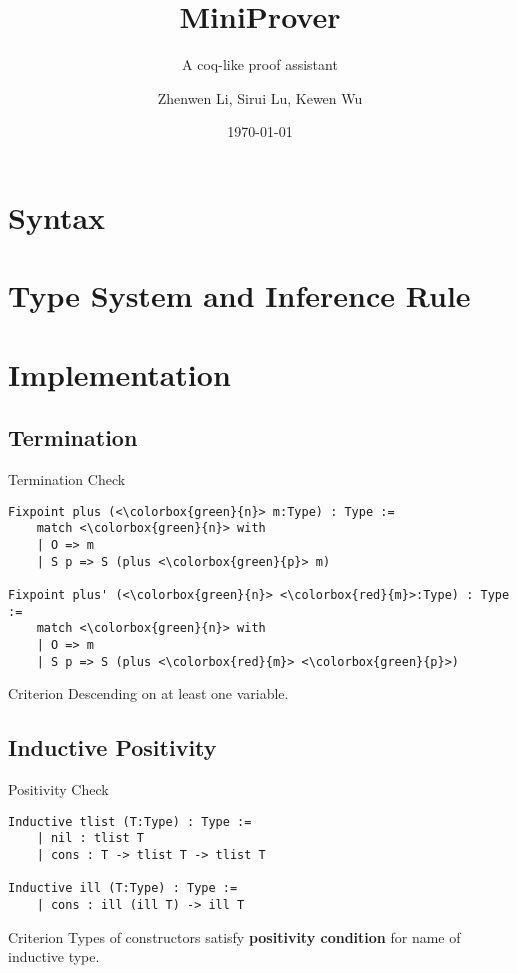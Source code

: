 \documentclass[UTF-8]{beamer}
\title{MiniProver}
\subtitle{A coq-like proof assistant}
\institute{Peking University}
\author{Zhenwen Li, Sirui Lu, Kewen Wu}
\date{\today}
\begin{document}
\frame{\titlepage}

\section{Syntax}
\begin{frame}
\end{frame}

\section{Type System and Inference Rule}
\begin{frame}
\end{frame}

\section{Implementation}
\subsection{Termination}
\begin{frame}[fragile]{Termination Check}
\begin{verbatim}
Fixpoint plus (<\colorbox{green}{n}> m:Type) : Type :=
    match <\colorbox{green}{n}> with
    | O => m
    | S p => S (plus <\colorbox{green}{p}> m)

Fixpoint plus' (<\colorbox{green}{n}> <\colorbox{red}{m}>:Type) : Type :=
    match <\colorbox{green}{n}> with
    | O => m
    | S p => S (plus <\colorbox{red}{m}> <\colorbox{green}{p}>)
\end{verbatim}
\begin{alertblock}{Criterion}
    Descending on at least one variable.
\end{alertblock}
\end{frame}

\subsection{Inductive Positivity}
\begin{frame}[fragile]{Positivity Check}
\begin{verbatim}
Inductive tlist (T:Type) : Type :=
    | nil : tlist T
    | cons : T -> tlist T -> tlist T

Inductive ill (T:Type) : Type :=
    | cons : ill (ill T) -> ill T
\end{verbatim}
\begin{alertblock}{Criterion}
    Types of constructors satisfy \textbf{positivity condition} for name of inductive type.
\end{alertblock}
\end{frame}
\end{document}
